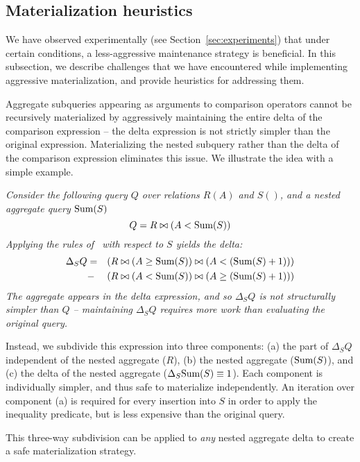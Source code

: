 \subsection{Materialization heuristics}
\label{sec:advanced-rewriting}

We have observed experimentally (see Section~\ref{sec:experiments}) that under certain conditions, a less-aggressive maintenance strategy is beneficial.
In this subsection, we describe challenges that we have encountered while implementing aggressive materialization, and provide heuristics for addressing them.

Aggregate subqueries appearing as arguments to comparison operators cannot be recursively materialized by aggressively maintaining the entire delta of the comparison expression -- the delta expression is not strictly simpler than the original expression.  Materializing the nested subquery rather than the delta of the comparison expression eliminates this issue.  We illustrate the idea with a simple example.

\vspace{-1mm}
\begin{example} \em
Consider the following query $Q$ over relations $R(A)$ and $S()$, and a nested aggregate query $\mbox{Sum}(S)$
\vspace*{-0.05in}
{\small $$Q = R \bowtie (A < \mbox{Sum}(S))$$}
\noindent Applying the rules of~\cite{koch-pods:10} with respect to $S$ yields the delta:
{\small \begin{eqnarray*}
\Delta_SQ & =  & (R \bowtie (A \geq \mbox{Sum}(S)) \bowtie (A < (\mbox{Sum}(S) +1)))\\
&-& (R \bowtie (A <  \mbox{Sum}(S)) \bowtie (A \geq (\mbox{Sum}(S) + 1)))
\end{eqnarray*}}
The aggregate appears in the delta expression, and so $\Delta_SQ$ is not structurally simpler than $Q$ -- maintaining $\Delta_S Q$ requires more work than evaluating the original query.  

Instead, we subdivide this expression into three components: (a) the part of $\Delta_S Q$ independent of the nested aggregate ($R$), (b) the nested aggregate ($\mbox{Sum}(S)$), and (c) the delta of the nested aggregate ($\Delta_S\mbox{Sum}(S) \equiv 1$).  Each component is individually simpler, and thus safe to materialize independently.  An iteration over component (a) is required for every insertion into $S$ in order to apply the inequality predicate, but is less expensive than the original query.

This three-way subdivision can be applied to {\it any} nested aggregate delta to create a safe materialization strategy.
\end{example}

